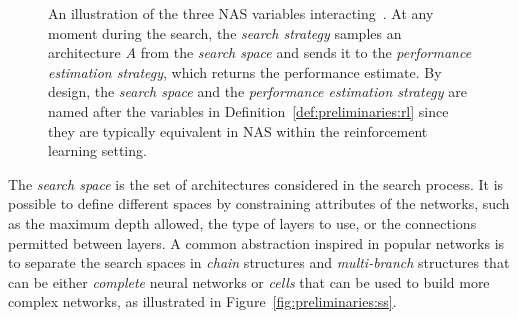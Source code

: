 \begin{figure}[ht]
\begin{center}
\caption{An illustration of the three NAS variables interacting~\citep{NASsurvey}. At any moment during the search, the \textit{search strategy} samples an architecture $A$ from the \textit{search space} and sends it to the \textit{performance estimation strategy}, which returns the performance estimate. By design, the \textit{search space} and the \textit{performance estimation strategy} are named after the variables in Definition~\ref{def:preliminaries:rl} since they are typically equivalent in NAS within the reinforcement learning setting.}
\label{fig:preliminaries:nas}
\end{center}
\end{figure}

The \textit{search space} is the set of architectures considered in the search process. It is possible to define different spaces by constraining attributes of the networks, such as the maximum depth allowed, the type of layers to use, or the connections permitted between layers. A common abstraction inspired in popular networks is to separate the search spaces in \textit{chain} structures and \textit{multi-branch} structures that can be either \textit{complete} neural networks or \textit{cells} that can be used to build more complex networks, as illustrated in Figure~\ref{fig:preliminaries:ss}.

